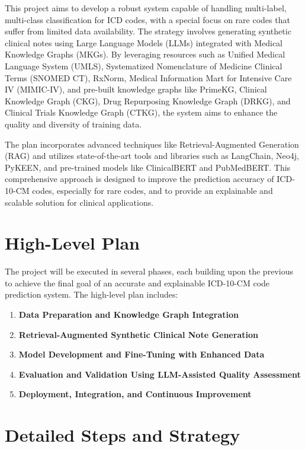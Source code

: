 \documentclass[12pt, a4paper]{article}
\begin{document}
This project aims to develop a robust system capable of handling multi-label, multi-class classification for ICD codes, with a special focus on rare codes that suffer from limited data availability. The strategy involves generating synthetic clinical notes using Large Language Models (LLMs) integrated with Medical Knowledge Graphs (MKGs). By leveraging resources such as Unified Medical Language System (UMLS), Systematized Nomenclature of Medicine Clinical Terms (SNOMED CT), RxNorm, Medical Information Mart for Intensive Care IV (MIMIC-IV), and pre-built knowledge graphs like PrimeKG, Clinical Knowledge Graph (CKG), Drug Repurposing Knowledge Graph (DRKG), and Clinical Trials Knowledge Graph (CTKG), the system aims to enhance the quality and diversity of training data.

The plan incorporates advanced techniques like Retrieval-Augmented Generation (RAG) and utilizes state-of-the-art tools and libraries such as LangChain, Neo4j, PyKEEN, and pre-trained models like ClinicalBERT and PubMedBERT. This comprehensive approach is designed to improve the prediction accuracy of ICD-10-CM codes, especially for rare codes, and to provide an explainable and scalable solution for clinical applications.

\section{High-Level Plan}

The project will be executed in several phases, each building upon the previous to achieve the final goal of an accurate and explainable ICD-10-CM code prediction system. The high-level plan includes:

\begin{enumerate}
    \item \textbf{Data Preparation and Knowledge Graph Integration}
    \item \textbf{Retrieval-Augmented Synthetic Clinical Note Generation}
    \item \textbf{Model Development and Fine-Tuning with Enhanced Data}
    \item \textbf{Evaluation and Validation Using LLM-Assisted Quality Assessment}
    \item \textbf{Deployment, Integration, and Continuous Improvement}
\end{enumerate}

\section{Detailed Steps and Strategy}
\end{document}
